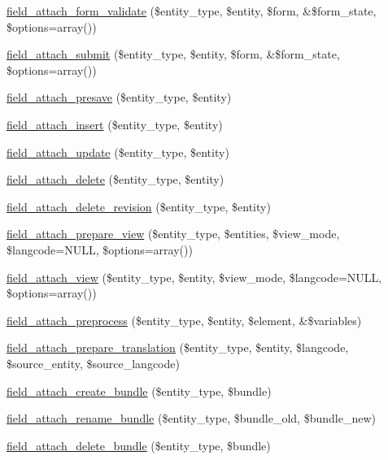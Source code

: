 \begin{DoxyCompactItemize}
\hyperlink{group__field__attach_ga8c9a9775772774cefae4f6b9959d477e}{field\_\-attach\_\-form\_\-validate} (\$entity\_\-type, \$entity, \$form, \&\$form\_\-state, \$options=array())
\item 
\hyperlink{group__field__attach_ga756e59f651aa870ee79dd488b4e799c8}{field\_\-attach\_\-submit} (\$entity\_\-type, \$entity, \$form, \&\$form\_\-state, \$options=array())
\item 
\hyperlink{group__field__attach_ga8f3ecf532dc49f8aed138695489fc81d}{field\_\-attach\_\-presave} (\$entity\_\-type, \$entity)
\item 
\hyperlink{group__field__attach_gad7c37d577b97db5e0c182bc570ed7cf4}{field\_\-attach\_\-insert} (\$entity\_\-type, \$entity)
\item 
\hyperlink{group__field__attach_ga8d15efdca36306ea04552bed4986e77b}{field\_\-attach\_\-update} (\$entity\_\-type, \$entity)
\item 
\hyperlink{group__field__attach_gac2e3658c9c02d0d0e71359f9ef2f207a}{field\_\-attach\_\-delete} (\$entity\_\-type, \$entity)
\item 
\hyperlink{group__field__attach_gaa9eae65e6d9f1996cb27a55ba25b56e9}{field\_\-attach\_\-delete\_\-revision} (\$entity\_\-type, \$entity)
\item 
\hyperlink{group__field__attach_ga12b5fce5e2b2adb487c485c63bfe0298}{field\_\-attach\_\-prepare\_\-view} (\$entity\_\-type, \$entities, \$view\_\-mode, \$langcode=NULL, \$options=array())
\item 
\hyperlink{group__field__attach_gaa752a8fd31173fd2308d71eb059e00c7}{field\_\-attach\_\-view} (\$entity\_\-type, \$entity, \$view\_\-mode, \$langcode=NULL, \$options=array())
\item 
\hyperlink{group__field__attach_ga46c512cf3ddf3937a78f9c7a0da4dce6}{field\_\-attach\_\-preprocess} (\$entity\_\-type, \$entity, \$element, \&\$variables)
\item 
\hyperlink{group__field__attach_ga7ce84fbf2feb3e4b22bacbe6ed5ed103}{field\_\-attach\_\-prepare\_\-translation} (\$entity\_\-type, \$entity, \$langcode, \$source\_\-entity, \$source\_\-langcode)
\item 
\hyperlink{group__field__attach_gab3649772ef7a6416b013a4a556ce51bf}{field\_\-attach\_\-create\_\-bundle} (\$entity\_\-type, \$bundle)
\item 
\hyperlink{group__field__attach_ga25bffa83f84504c834d27b2126f58f51}{field\_\-attach\_\-rename\_\-bundle} (\$entity\_\-type, \$bundle\_\-old, \$bundle\_\-new)
\item 
\hyperlink{group__field__attach_ga97e62a6e4ef80e5513c9ec085d718c7b}{field\_\-attach\_\-delete\_\-bundle} (\$entity\_\-type, \$bundle)
\end{DoxyCompactItemize}
